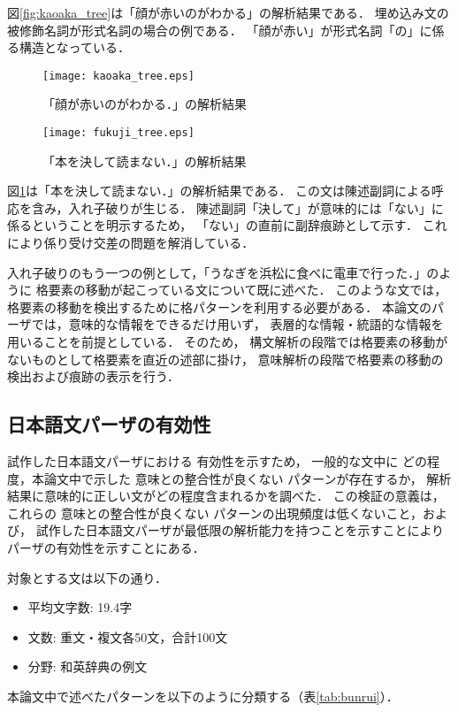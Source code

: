 \documentclass[japanese]{jnlp_1.2}
\begin{document}
図\ref{fig:kaoaka_tree}は「顔が赤いのがわかる」の解析結果である．
埋め込み文の被修飾名詞が形式名詞の場合の例である．
「顔が赤い」が形式名詞「の」に係る構造となっている．

\begin{figure}[p]
  \centering
      \texttt{[image: kaoaka\_tree.eps]}
  \caption{「顔が赤いのがわかる．」の解析結果}\label{fig:kaoaka_tree}
    \par\vspace{20pt}
      \texttt{[image: fukuji\_tree.eps]}
  \caption{「本を決して読まない．」の解析結果}\label{fig:fukuji_tree}
\end{figure}



図\ref{fig:fukuji_tree}は「本を決して読まない．」の解析結果である．
この文は陳述副詞による呼応を含み，入れ子破りが生じる．
陳述副詞「決して」が意味的には「ない」に係るということを明示するため，
「ない」の直前に副辞痕跡として示す．
これにより係り受け交差の問題を解消している．

入れ子破りのもう一つの例として，「うなぎを浜松に食べに電車で行った．」のように
格要素の移動が起こっている文について既に述べた．
このような文では，格要素の移動を検出するために格パターンを利用する必要がある．
本論文のパーザでは，意味的な情報をできるだけ用いず，
表層的な情報・統語的な情報を用いることを前提としている．
そのため，
構文解析の段階では格要素の移動がないものとして格要素を直近の述部に掛け，
意味解析の段階で格要素の移動の検出および痕跡の表示を行う．


\subsection{日本語文パーザの有効性}
試作した日本語文パーザにおける
有効性を示すため，
一般的な文中に
どの程度，本論文中で示した
意味との整合性が良くない
パターンが存在するか，
解析結果に意味的に正しい文がどの程度含まれるかを調べた．
この検証の意義は，これらの
意味との整合性が良くない
パターンの出現頻度は低くないこと，および，
試作した日本語文パーザが最低限の解析能力を持つことを示すことにより
パーザの有効性を示すことにある．

対象とする文は以下の通り．
\begin{itemize}
\item 平均文字数: 19.4字
\item 文数: 重文・複文各50文，合計100文
\item 分野: 和英辞典の例文
\end{itemize}

本論文中で述べたパターンを以下のように分類する（表\ref{tab:bunrui}）．
\end{document}
